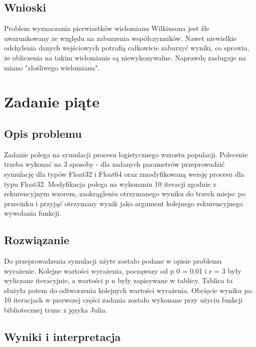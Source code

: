 \documentclass[8pt,letterpaper]{article}
\begin{document}
\subsection{Wnioski}

\hspace{1.0 cm} Problem wyznaczania pierwiastków wielomianu Wilkinsona jest źle uwarunkowany ze względu na zaburzenia współczynników. Nawet niewielkie odchylenia danych wejściowych potrafią całkowicie zaburzyć wyniki, co sprawia, że obliczenia na takim wielomianie są niewykonywalne. Naprawdę zasługuje na miano "złośliwego wielomianu".




\section{Zadanie piąte}
\subsection{Opis problemu}
\hspace{1.0 cm}Zadanie polega na symulacji procesu  logistycznego wzrostu populacji. Polecenie trzeba wykonać na 3 sposoby - dla zadanych parametrów przeprowadzić symulację dla typów Float32 i Float64 oraz zmodyfikowaną wersję procesu dla typu Float32. Modyfikacja polega na wykonaniu 10 iteracji zgodnie z rekurencyjnym wzorem, zaokrągleniu otrzymanego wyniku do trzech miejsc po przecinku i przyjąć otrzymany wynik jako argument kolejnego rekurencyjnego wywołania funkcji.
\\
\subsection{Rozwiązanie}
\hspace{1.0 cm}Do przeprowadzenia symulacji użyte zostało podane w opisie problemu wyrażenie. Kolejne wartości wyrażenia, począwszy od p 0 = 0.01 i r = 3 były wyliczane iteracyjnie, a wartości p n były zapisywane w tablicy. Tablica ta służyła potem do odtworzenia kolejnych wartości wyrażenia. Obcięcie wyniku po 10 iteracjach w pierwszej części zadania zostało wykonane przy użyciu funkcji bibliotecznej trunc z języka Julia.

\subsection{Wyniki i interpretacja}
\end{document}
